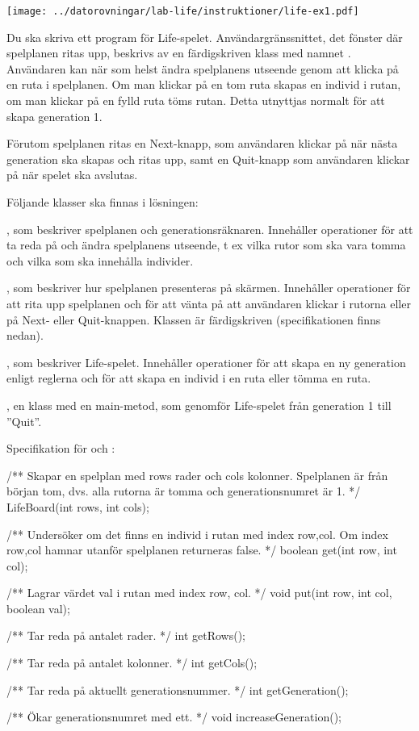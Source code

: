 \begin{center}
\texttt{[image: ../datorovningar/lab-life/instruktioner/life-ex1.pdf]}
\end{center}

Du ska skriva ett program för Life-spelet. Användargränssnittet, det fönster där spelplanen ritas upp, beskrivs av en färdigskriven klass med namnet . Användaren kan när som helst ändra spelplanens utseende genom att klicka på en ruta i spelplanen. Om man klickar på en tom ruta skapas en individ i rutan, om man klickar på en fylld ruta töms rutan. Detta utnyttjas normalt för att skapa generation 1.

Förutom spelplanen ritas en Next-knapp, som användaren klickar på när nästa generation ska skapas och ritas upp, samt en Quit-knapp som användaren klickar på när spelet ska avslutas.

Följande klasser ska finnas i lösningen:

, som beskriver spelplanen och generationsräknaren. Innehåller operationer för att ta reda på och ändra spelplanens utseende, t ex vilka rutor som ska vara tomma och vilka som ska innehålla individer.

, som beskriver hur spelplanen presenteras på skärmen. Innehåller operationer för att rita upp spelplanen och för att vänta på att användaren klickar i rutorna eller på Next- eller Quit-knappen. Klassen är färdigskriven (specifikationen finns nedan).

, som beskriver Life-spelet. Innehåller operationer för att skapa en ny generation enligt reglerna och för att skapa en individ i en ruta eller tömma en ruta.

, en klass med en main-metod, som genomför Life-spelet från generation 1 till ''Quit''.

Specifikation för  och :

\begin{Spec}
/** Skapar en spelplan med rows rader och cols kolonner. Spelplanen är från
    början tom, dvs. alla rutorna är tomma och generationsnumret är 1. */
LifeBoard(int rows, int cols);

/** Undersöker om det finns en individ i rutan med index row,col. Om
    index row,col hamnar utanför spelplanen returneras false. */
boolean get(int row, int col);

/** Lagrar värdet val i rutan med index row, col. */
void put(int row, int col, boolean val);

/** Tar reda på antalet rader. */
int getRows();

/** Tar reda på antalet kolonner. */
int getCols();

/** Tar reda på aktuellt generationsnummer. */
int getGeneration();

/** Ökar generationsnumret med ett. */
void increaseGeneration();
\end{Spec}

